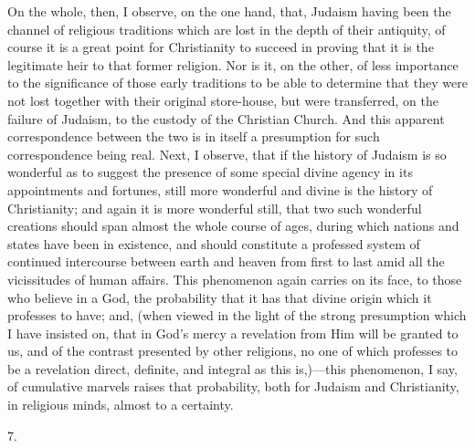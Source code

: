 On the whole, then, I observe, on the one hand, that, Judaism
having been the channel of religious traditions which are lost in the
depth of their antiquity, of course it is a great point for
Christianity to succeed in proving that it is the legitimate heir to
that former religion. Nor is it, on the other, of less importance to
the significance of those early traditions to be able to determine
that they were not lost together with their original store-house, but
were transferred, on the failure of Judaism, to the custody of the
Christian Church. And this apparent correspondence between the two is
in itself a presumption for such correspondence being real. Next, I
observe, that if the history of Judaism is so wonderful as to suggest
the presence of some special divine agency in its appointments and
fortunes, still more wonderful and divine is the history of
Christianity; and again it is more wonderful still, that two such
wonderful creations should span almost the whole course of ages,
during which nations and states have been in existence, and should
constitute a professed system of continued intercourse between earth
and heaven from first to last amid all the vicissitudes of human
affairs. This phenomenon again carries on its face, to those who
believe in a God, the probability that it has that divine origin which
it professes to have; and, (when viewed in the light of the strong
presumption which I have insisted on, that in God's mercy a revelation
from Him will be granted to us, and of the contrast presented by other
religions, no one of which professes to be a revelation direct,
definite, and integral as this is,)—this phenomenon, I say, of
cumulative marvels raises that probability, both for Judaism and
Christianity, in religious minds, almost to a certainty.

7.

